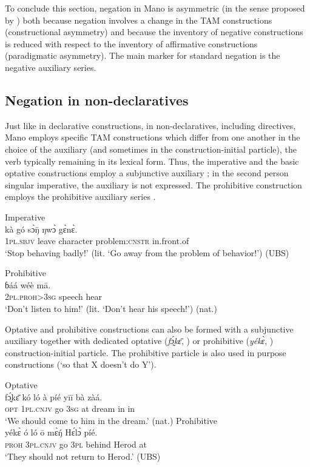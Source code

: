 \documentclass[output=paper,colorlinks,citecolor=brown]{langscibook}
\begin{document}
To conclude this section, negation in Mano is asymmetric (in the sense proposed by \citealt{Miestamo2005}) both because negation involves a change in the TAM constructions (constructional asymmetry) and because the inventory of negative constructions is reduced with respect to the inventory of affirmative constructions (paradigmatic asymmetry). The main marker for standard negation is the negative auxiliary series.

\subsection{Negation in non-declaratives}\label{sec:mano:2.2}

Just like in declarative constructions, in non-declaratives, including directives, Mano employs specific TAM constructions which differ from one another in the choice of the auxiliary (and sometimes in the construction-initial particle), the verb typically remaining in its lexical form. Thus, the imperative and the basic optative constructions employ a subjunctive auxiliary ; in the second person singular imperative, the auxiliary is not expressed. The prohibitive construction employs the prohibitive auxiliary series . 

\ea\label{ex:mano:15}Imperative\\
    \gll kà gó sɔ̀ŋ̄ ŋwɔ̀ gɛ̀nɛ̀.   \\
         1\textsc{pl.sbjv} leave character problem:\textsc{cnstr} in.front.of   \\
    \glt ‘Stop behaving badly!’ (lit. ‘Go away from the problem of behavior!’) (UBS)
\z

\ea\label{ex:mano:16}Prohibitive\\
    \gll ɓáá wéè mā.\\
         \textsc{2pl.proh>3sg} speech hear     \\
    \glt ‘Don’t listen to him!’ (lit. ‘Don’t hear his speech!’) (nat.)
\z

Optative and prohibitive constructions can also be formed with a subjunctive auxiliary together with dedicated optative (\textit{fɔ̰́kɛ̄}, ) or prohibitive (\textit{yékɛ̀}, ) construction-initial particle. 
The prohibitive particle is also used in purpose constructions (‘so that X doesn’t do Y’).

\ea\label{ex:mano:17}Optative\\
    \gll fɔ̰́kɛ̄ kó ló à píé yīī bà zàá. \\
         \textsc{opt} 1\textsc{pl.cnjv} go \textsc{3sg} at dream in in\\
    \glt ‘We should come to him in the dream.’ (nat.)
\z
{
\ea\label{ex:mano:18}Prohibitive\\
    \gll yékɛ̀ ó ló ō mɛ̀ŋ́ Hɛ́lɔ̀ píé. \\
         \textsc{proh} \textsc{3pl.cnjv} go \textsc{3pl} behind Herod at \\
    \glt ‘They should not return to Herod.’ (UBS)
\z}
\end{document}
